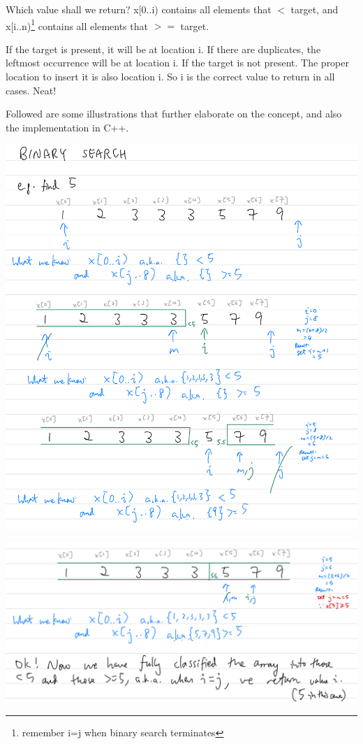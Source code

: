 Which value shall we return? x[0..i) contains all elements that $<$ target, and x[i..n)\footnote{remember i=j when binary search terminates} contains all elements that $>=$ target. 

If the target is present, it will be at location i. If there are duplicates, the leftmost occurrence will be at location i. If the target is not present. The proper location to insert it is also location i. So i is the correct value to return in all cases. Neat!
\vspace{6mm}

Followed are some illustrations that further elaborate on the concept, and also the implementation in C++.
\vspace{6mm}

\includegraphics[width=14cm]{images/ch7-binarysearch51.png}

\includegraphics[width=14cm]{images/ch7-binarysearch52.png}

